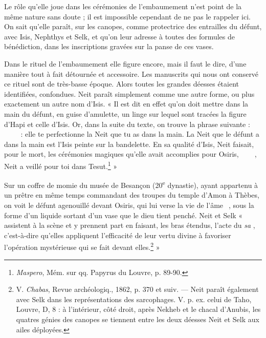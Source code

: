 \documentclass[a4paper, 11pt, oneside]{article}
\newcommand*\hieroAAAW{\raisebox{0.5ex}{}}
\newcommand*\hieroAABR{}
\newcommand*\hieroAACS{}
\newcommand*\hieroAADG{}
\newcommand*\hieroAADM{}
\newcommand*\hieroAADR{}
\newcommand*\hieroAAEX{}
\newcommand*\hieroAAMP{}
\newcommand*\hieroAARZ{}
\newcommand*\hieroAATD{}
\newcommand*\hieroAATE{}
\newcommand*\hieroAATF{}
\newcommand*\hieroAATG{}
\newcommand*\hieroAATH{}
\newcommand*\hieroAATI{}
\newcommand*\hieroAATJ{}
\newcommand*\hieroAATK{}
\newcommand*\hieroAATL{}
\newcommand*\hieroAATM{}
\newcommand*\hieroAATN{}
\newcommand*\hieroAATO{}
\begin{document}
Le rôle qu'elle joue dans les cérémonies de l'embaumement n'est point de la même nature sans doute ; il est impossible cependant de ne pas le rappeler ici. On sait qu'elle paraît, sur les canopes, comme protectrice des entrailles du défunt, avec Isis, Nephthys et Selk, et qu'on leur adresse à toutes des formules de bénédiction, dans les inscriptions gravées sur la panse de ces vases.

Dans le rituel de l'embaumement elle figure encore, mais il faut le dire, d'une manière tout à fait détournée et accessoire. Les manuscrits qui nous ont conservé ce rituel sont de très-basse époque. Alors toutes les grandes déesses étaient identifiées, confondues. Neit paraît simplement comme une autre forme, ou plus exactement un autre nom d'Isis. « Il est dit en effet qu'on doit mettre dans la main du défunt, en guise d'amulette, un linge sur lequel sont tracées la figure d'Hapi et celle d'Isis. Or, dans la suite du texte, on trouve la phrase suivante : $\hieroAACS\:\hieroAATD\:\hieroAATE\allowbreak\:\hieroAATF\:\hieroAAEX\:\hieroAATG\allowbreak\:\hieroAADR\:\hieroAABR\allowbreak\:\hieroAATH\:\hieroAATI$ : elle te perfectionne la Neit que tu as dans la main. La Neit que le défunt a dans la main est l'Isis peinte sur la bandelette. En sa qualité d'Isis, Neit faisait, pour le mort, les cérémonies magiques qu'elle avait accomplies pour Osiris, $\hieroAADG\:\hieroAATJ\:\hieroAATK\allowbreak\:\hieroAAEX\:\hieroAABR\:\hieroAATL\:\hieroAATM\allowbreak\:\hieroAAMP\:\hieroAAAW$, Neit a veillé pour toi dans Tesut.\footnote{\emph{Maspero}, Mém. sur qq. Papyrus du Louvre, p. 89-90.} »

Sur un coffre de momie du musée de Besançon (20\textsuperscript{e} dynastie), ayant appartenu à un prêtre en même temps commandant des troupes du temple d'Amon à Thèbes, on voit le défunt agenouillé devant Osiris, qui lui verse la vie de l'âme $\hieroAARZ\:\hieroAATN\:\hieroAADM$, sous la forme d'un liquide sortant d'un vase que le dieu tient penché. Neit et Selk « assistent à la scène et y prennent part en faisant, les bras étendus, l'acte du \emph{sa} $\hieroAATO$, c'est-à-dire qu'elles appliquent l'efficacité de leur vertu divine à favoriser l'opération mystérieuse qui se fait devant elles.\footnote{V. \emph{Chabas}, Revue archéologiq., 1862, p. 370 et suiv. --- Neit paraît également avec Selk dans les représentations des sarcophages. V. p. ex. celui de Taho, Louvre, D, 8 : à l'intérieur, côté droit, après Nekheb et le chacal d'Anubis, les quatres génies des canopes se tiennent entre les deux déesses Neit et Selk aux ailes déployées.} »
\end{document}
